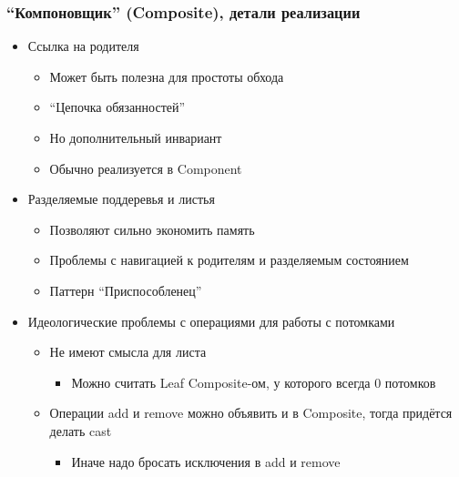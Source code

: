 \documentclass[xetex,mathserif,serif]{beamer}
\begin{document}
	\begin{frame}
		\frametitle{``Компоновщик'' (Composite), детали реализации}
		\begin{itemize}
			\item Ссылка на родителя
			\begin{itemize}
				\item Может быть полезна для простоты обхода
				\item ``Цепочка обязанностей''
				\item Но дополнительный инвариант
				\item Обычно реализуется в Component
			\end{itemize}
			\item Разделяемые поддеревья и листья
			\begin{itemize}
				\item Позволяют сильно экономить память
				\item Проблемы с навигацией к родителям и разделяемым состоянием
				\item Паттерн ``Приспособленец''
			\end{itemize}
			\item Идеологические проблемы с операциями для работы с потомками
			\begin{itemize}
				\item Не имеют смысла для листа
				\begin{itemize}
					\item Можно считать Leaf Composite-ом, у которого всегда 0 потомков
				\end{itemize}
				\item Операции add и remove можно объявить и в Composite, тогда придётся делать cast
				\begin{itemize}
					\item Иначе надо бросать исключения в add и remove
				\end{itemize}
			\end{itemize}
		\end{itemize}
	\end{frame}
\end{document}
